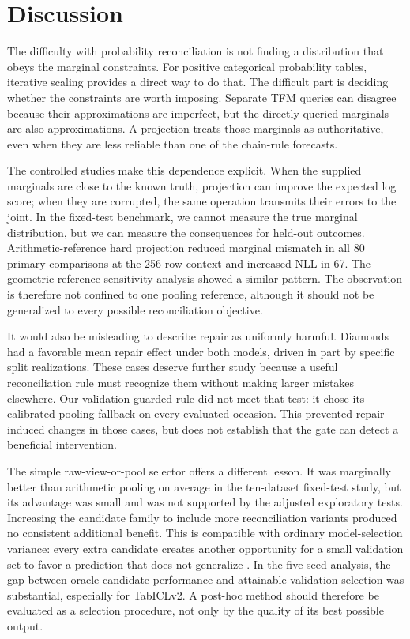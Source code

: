\documentclass[a4paper,fleqn]{cas-sc}
\begin{document}
\section{Discussion}
The difficulty with probability reconciliation is not finding a distribution that obeys the marginal constraints. For positive categorical probability tables, iterative scaling provides a direct way to do that. The difficult part is deciding whether the constraints are worth imposing. Separate TFM queries can disagree because their approximations are imperfect, but the directly queried marginals are also approximations. A projection treats those marginals as authoritative, even when they are less reliable than one of the chain-rule forecasts.

The controlled studies make this dependence explicit. When the supplied marginals are close to the known truth, projection can improve the expected log score; when they are corrupted, the same operation transmits their errors to the joint. In the fixed-test benchmark, we cannot measure the true marginal distribution, but we can measure the consequences for held-out outcomes. Arithmetic-reference hard projection reduced marginal mismatch in all 80 primary comparisons at the 256-row context and increased NLL in 67. The geometric-reference sensitivity analysis showed a similar pattern. The observation is therefore not confined to one pooling reference, although it should not be generalized to every possible reconciliation objective.

It would also be misleading to describe repair as uniformly harmful. Diamonds had a favorable mean repair effect under both models, driven in part by specific split realizations. These cases deserve further study because a useful reconciliation rule must recognize them without making larger mistakes elsewhere. Our validation-guarded rule did not meet that test: it chose its calibrated-pooling fallback on every evaluated occasion. This prevented repair-induced changes in those cases, but does not establish that the gate can detect a beneficial intervention.

The simple raw-view-or-pool selector offers a different lesson. It was marginally better than arithmetic pooling on average in the ten-dataset fixed-test study, but its advantage was small and was not supported by the adjusted exploratory tests. Increasing the candidate family to include more reconciliation variants produced no consistent additional benefit. This is compatible with ordinary model-selection variance: every extra candidate creates another opportunity for a small validation set to favor a prediction that does not generalize \citep{cawley2010overfitting}. In the five-seed analysis, the gap between oracle candidate performance and attainable validation selection was substantial, especially for TabICLv2. A post-hoc method should therefore be evaluated as a selection procedure, not only by the quality of its best possible output.
\end{document}
